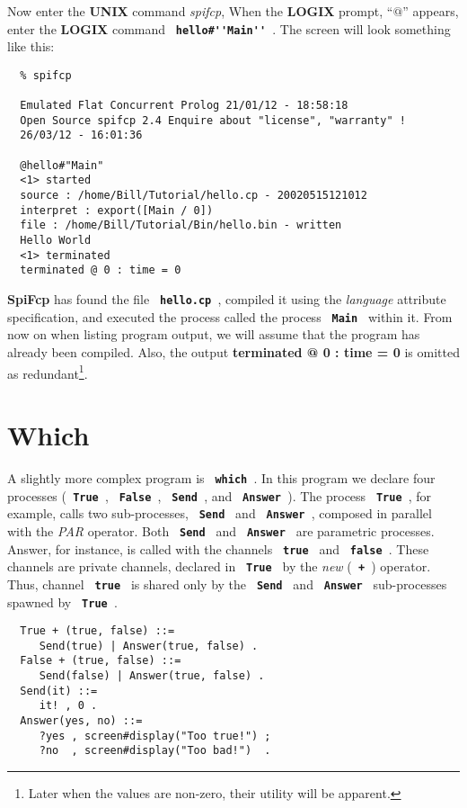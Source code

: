 \documentclass[twoside,10pt]{report}
\begin{document}
Now enter the {\bf UNIX} command {\em spifcp},
When the {\bf LOGIX} prompt, ``{\bf $@$}'' appears,
enter the {\bf LOGIX} command {\bf \verb+ hello#''Main'' +}.
The screen will look something like this:

\begin{verbatim}
  % spifcp

  Emulated Flat Concurrent Prolog 21/01/12 - 18:58:18
  Open Source spifcp 2.4 Enquire about "license", "warranty" !
  26/03/12 - 16:01:36

  @hello#"Main"
  <1> started
  source : /home/Bill/Tutorial/hello.cp - 20020515121012
  interpret : export([Main / 0])
  file : /home/Bill/Tutorial/Bin/hello.bin - written
  Hello World
  <1> terminated
  terminated @ 0 : time = 0
\end{verbatim}

\noindent
{\bf SpiFcp} has found the file {\bf \verb+ hello.cp +}, compiled it using
the {\em language} attribute specification, and executed the process
called the process {\bf \verb+ Main +} within it.
From now on when listing
program output, we will assume that the program has already been
compiled.  Also, the output {\bf terminated @ 0 : time = 0} is omitted as
redundant\footnote{Later when the values are non-zero, their utility will
be apparent.}.

\section{Which}

A slightly more complex program is {\bf \verb+ which +}. In this program we
declare four processes ({\bf \verb+ True +}, {\bf \verb+ False +},
{\bf \verb+ Send +}, and {\bf \verb+ Answer +}).  The process
{\bf \verb+ True +}, for example, calls two sub-processes, {\bf \verb+ Send +}
and {\bf \verb+ Answer +}, composed in parallel
with the {\em PAR} operator.  Both {\bf \verb+ Send +} and
{\bf \verb+ Answer +} are parametric processes. Answer, for instance, is 
called with the channels {\bf \verb+ true +} and {\bf \verb+ false +}.  These
channels are private channels, declared in {\bf \verb+ True +} by
the {\em new} ({\bf \verb- + -}) operator. Thus, channel {\bf \verb+ true +}
is shared only
by the {\bf \verb+ Send +} and {\bf \verb+ Answer +} sub-processes spawned by
{\bf \verb+ True +}.

\begin{verbatim}
  True + (true, false) ::=
     Send(true) | Answer(true, false) .
  False + (true, false) ::=
     Send(false) | Answer(true, false) .
  Send(it) ::=
     it! , 0 .
  Answer(yes, no) ::=
     ?yes , screen#display("Too true!") ;
     ?no  , screen#display("Too bad!")  .
\end{verbatim}
\end{document}
